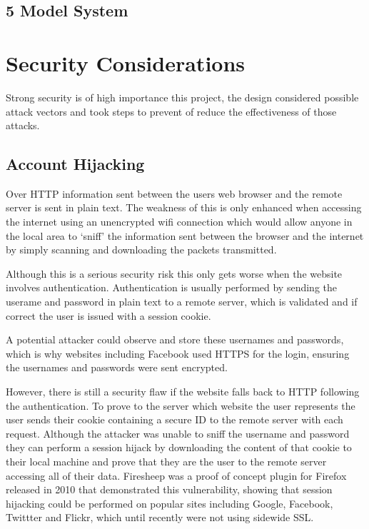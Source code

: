 \subsection{5 Model System}

\section{Security Considerations}
Strong security is of high importance this project, the design considered possible attack vectors and took steps to prevent of reduce the effectiveness of those attacks.

\subsection{Account Hijacking}

Over HTTP information sent between the users web browser and the remote server is sent in plain text. The weakness of this is only enhanced when accessing the internet using an unencrypted wifi connection which would allow anyone in the local area to `sniff' the information sent between the browser and the internet by simply scanning and downloading the packets transmitted.

Although this is a serious security risk this only gets worse when the website involves authentication. Authentication is usually performed by sending the userame and password in plain text to a remote server, which is validated and if correct the user is issued with a session cookie.

A potential attacker could observe and store these usernames and passwords, which is why websites including Facebook used HTTPS for the login, ensuring the usernames and passwords were sent encrypted. 

However, there is still a security flaw if the website falls back to HTTP following the authentication. To prove to the server which website the user represents the user sends their cookie containing a secure ID to the remote server with each request. Although the attacker was unable to sniff the username and password they can perform a session hijack by downloading the content of that cookie to their local machine and prove that they are the user to the remote server accessing all of their data. 
% 
Firesheep was a proof of concept plugin for Firefox released in 2010 that demonstrated this vulnerability, showing that session hijacking could be performed on popular sites including Google, Facebook, Twittter and Flickr, which until recently were not using sidewide SSL.

